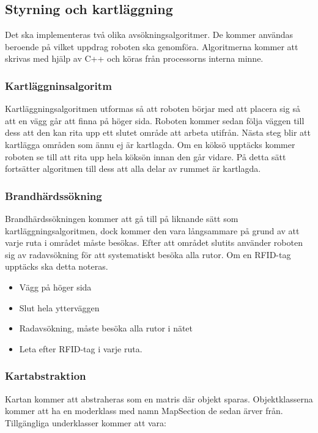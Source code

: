 \documentclass[a4paper,12pt,fleqn]{article}
\begin{document}
\subsection{Styrning och kartläggning}
Det ska implementeras två olika avsökningsalgoritmer. De kommer användas beroende på vilket uppdrag roboten ska genomföra. Algoritmerna kommer att skrivas med hjälp av C++ och köras från processorns interna minne. 

\subsubsection{Kartläggninsalgoritm}

Kartläggningsalgoritmen utformas så att roboten börjar med att placera sig så att en vägg går att finna på höger sida. Roboten kommer sedan följa väggen till dess att den kan rita upp ett slutet område att arbeta utifrån. Nästa steg blir att kartlägga områden som ännu ej är kartlagda. Om en köksö upptäcks kommer roboten se till att rita upp hela köksön innan den går vidare. På detta sätt fortsätter algoritmen till dess att alla delar av rummet är kartlagda. 

\subsubsection{Brandhärdssökning}

Brandhärdssökningen kommer att gå till på liknande sätt som kartläggningsalgoritmen, dock kommer den vara långsammare på grund av att varje ruta i området måste besökas. Efter att området slutits använder roboten sig av radavsökning för att systematiskt besöka alla rutor. Om en RFID-tag upptäcks ska detta noteras.

\begin{itemize}
\item{Vägg på höger sida}
\item{Slut hela ytterväggen}
\item{Radavsökning, måste besöka alla rutor i nätet}
\item{Leta efter RFID-tag i varje ruta.}
\end{itemize}

\subsubsection{Kartabstraktion}
Kartan kommer att abstraheras som en matris där objekt sparas. Objektklasserna kommer att ha en moderklass med namn MapSection de sedan ärver från. Tillgängliga underklasser kommer att vara:
\end{document}
